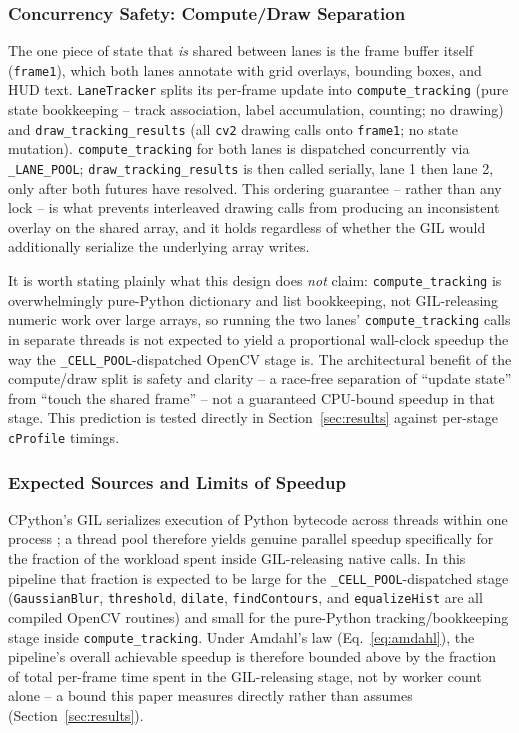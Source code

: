\documentclass[conference]{IEEEtran}
\newcommand{\code}[1]{\texttt{#1}}
\begin{document}
\subsubsection{Concurrency Safety: Compute/Draw Separation}
The one piece of state that \emph{is} shared between lanes is the frame
buffer itself (\code{frame1}), which both lanes annotate with grid
overlays, bounding boxes, and HUD text. \code{LaneTracker} splits its
per-frame update into \code{compute\_tracking} (pure state
bookkeeping -- track association, label accumulation, counting; no
drawing) and \code{draw\_tracking\_results} (all \code{cv2} drawing
calls onto \code{frame1}; no state mutation). \code{compute\_tracking}
for both lanes is dispatched concurrently via \code{\_LANE\_POOL};
\code{draw\_tracking\_results} is then called serially, lane 1 then
lane 2, only after both futures have resolved. This ordering guarantee
-- rather than any lock -- is what prevents interleaved drawing calls
from producing an inconsistent overlay on the shared array, and it holds
regardless of whether the GIL would additionally serialize the
underlying array writes.

It is worth stating plainly what this design does \emph{not} claim:
\code{compute\_tracking} is overwhelmingly pure-Python dictionary and
list bookkeeping, not GIL-releasing numeric work over large arrays, so
running the two lanes' \code{compute\_tracking} calls in separate
threads is not expected to yield a proportional wall-clock speedup the
way the \code{\_CELL\_POOL}-dispatched OpenCV stage is. The
architectural benefit of the compute/draw split is safety and clarity --
a race-free separation of ``update state'' from ``touch the shared
frame'' -- not a guaranteed CPU-bound speedup in that stage. This
prediction is tested directly in Section~\ref{sec:results} against
per-stage \code{cProfile} timings.

\subsubsection{Expected Sources and Limits of Speedup}
CPython's GIL serializes execution of Python bytecode across threads
within one process \cite{pythongil}; a thread pool therefore yields
genuine parallel speedup specifically for the fraction of the workload
spent inside GIL-releasing native calls. In this pipeline that fraction
is expected to be large for the \code{\_CELL\_POOL}-dispatched stage
(\code{GaussianBlur}, \code{threshold}, \code{dilate},
\code{findContours}, and \code{equalizeHist} are all compiled OpenCV
routines) and small for the pure-Python tracking/bookkeeping stage
inside \code{compute\_tracking}. Under Amdahl's law
(Eq.~\eqref{eq:amdahl}), the pipeline's overall achievable speedup is
therefore bounded above by the fraction of total per-frame time spent in
the GIL-releasing stage, not by worker count alone -- a bound this paper
measures directly rather than assumes (Section~\ref{sec:results}).
\end{document}
